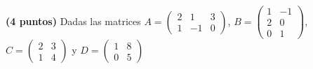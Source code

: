 \documentclass[addpoints,spanish, 12pt,a4paper]{exam}
\begin{document}
\begin{questions}
\question \textbf{(4 puntos)} Dadas las matrices  $A=\left(\begin{matrix}2 & 1 & 3\\1 & -1 & 0\end{matrix}\right)$,  $B=\left(\begin{matrix}1 & -1\\2 & 0\\0 & 1\end{matrix}\right)$, $C=\left(\begin{matrix}2 & 3\\1 & 4\end{matrix}\right)$ y $D=\left(\begin{matrix}1 & 8\\0 & 5\end{matrix}\right)$ 

\end{questions}
\end{document}
